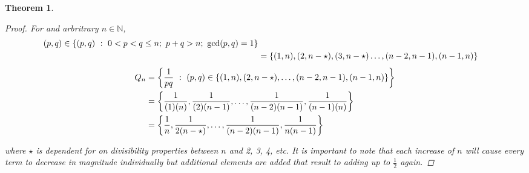 \documentclass[]{article}
\newcommand{\N}{\mathbb{N}}
\newcommand{\st}{\ : \ }
\newtheorem{theorem}{Theorem}
\begin{document}
\begin{theorem}
\begin{proof}


        For and arbritrary $n \in \N$,
        \begin{align*}
            (p,q) \in \qty{(p,q) \st 0 < p < q \leq n; \ p + q > n; \ \gcd(p,q) = 1}\\
                &= \qty{(1,n), (2,n - \star), (3, n - \star) \dots, (n-2, n-1), (n-1, n)}
        \end{align*}
        \begin{align*}
            Q_n &= \qty{\frac{1}{pq} \st (p,q) \in \qty{(1,n), (2,n-\star), \dots, (n-2, n-1), (n-1, n)}}\\
                &= \qty{\frac{1}{(1)(n)}, \frac{1}{(2)(n-1)}, \dots, \frac{1}{(n-2)(n-1)}, \frac{1}{(n-1)(n)}}\\
                &= \qty{\frac{1}{n}, \frac{1}{2(n-\star)}, \dots, \frac{1}{(n-2)(n-1)}, \frac{1}{n(n-1)}}
        \end{align*}

        where $\star$ is dependent for on divisibility properties between $n$ and 2, 3, 4, etc.
        It is important to note that each increase of $n$ will cause every term to decrease in magnitude individually but additional elements are added that result to adding up to $\frac{1}{2}$ again.


\end{proof}
\end{theorem}
\end{document}

